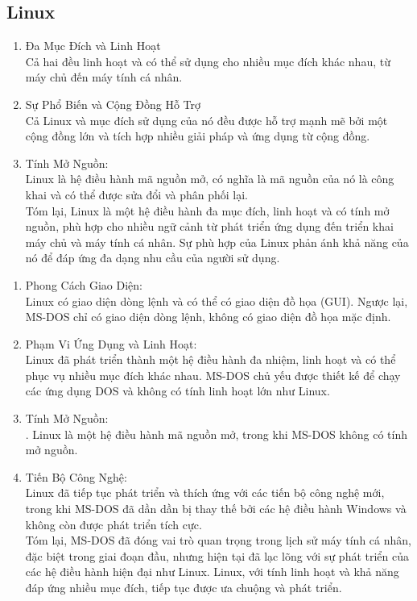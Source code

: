\documentclass[12pt,a4paper]{article}
\begin{document}
\subsection{Linux}
\begin{enumerate}

	\item Đa Mục Đích và Linh Hoạt\\
	Cả hai đều linh hoạt và có thể sử dụng cho nhiều mục đích khác nhau, từ máy chủ đến máy tính cá nhân.
	\item Sự Phổ Biến và Cộng Đồng Hỗ Trợ \\
	Cả Linux và mục đích sử dụng của nó đều được hỗ trợ mạnh mẽ bởi một cộng đồng lớn và tích hợp nhiều giải pháp và ứng dụng từ cộng đồng.
	\item Tính Mở Nguồn:\\
	Linux là hệ điều hành mã nguồn mở, có nghĩa là mã nguồn của nó là công khai và có thể được sửa đổi và phân phối lại.\\
	
	Tóm lại, Linux là một hệ điều hành đa mục đích, linh hoạt và có tính mở nguồn, phù hợp cho nhiều ngữ cảnh từ phát triển ứng dụng đến triển khai máy chủ và máy tính cá nhân. Sự phù hợp của Linux phản ánh khả năng của nó để đáp ứng đa dạng nhu cầu của người sử dụng.
\end{enumerate}
\begin{enumerate}
	\item Phong Cách Giao Diện:\\
	Linux có giao diện dòng lệnh và có thể có giao diện đồ họa (GUI). Ngược lại, MS-DOS chỉ có giao diện dòng lệnh, không có giao diện đồ họa mặc định.
	\item Phạm Vi Ứng Dụng và Linh Hoạt:\\
	Linux đã phát triển thành một hệ điều hành đa nhiệm, linh hoạt và có thể phục vụ nhiều mục đích khác nhau. MS-DOS chủ yếu được thiết kế để chạy các ứng dụng DOS và không có tính linh hoạt lớn như Linux.
	\item Tính Mở Nguồn:\\
	. Linux là một hệ điều hành mã nguồn mở, trong khi MS-DOS không có tính mở nguồn.
	\item Tiến Bộ Công Nghệ:\\
	Linux đã tiếp tục phát triển và thích ứng với các tiến bộ công nghệ mới, trong khi MS-DOS đã dần dần bị thay thế bởi các hệ điều hành Windows và không còn được phát triển tích cực.\\
	
	Tóm lại, MS-DOS đã đóng vai trò quan trọng trong lịch sử máy tính cá nhân, đặc biệt trong giai đoạn đầu, nhưng hiện tại đã lạc lõng với sự phát triển của các hệ điều hành hiện đại như Linux. Linux, với tính linh hoạt và khả năng đáp ứng nhiều mục đích, tiếp tục được ưa chuộng và phát triển.
\end{enumerate}
\end{document}
